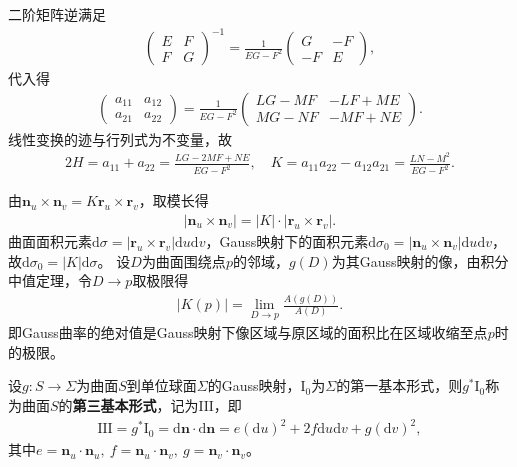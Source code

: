 \documentclass[../../main.tex]{subfiles}%
\begin{document}
二阶矩阵逆满足
\begin{align*}
\begin{pmatrix}
E & F\\
F & G
\end{pmatrix}^{-1}=\frac{1}{EG-F^2}
\begin{pmatrix}
G & -F\\
-F & E
\end{pmatrix},
\end{align*}
代入得
\begin{align}
\begin{pmatrix}
a_{11} & a_{12}\\
a_{21} & a_{22}
\end{pmatrix}=\frac{1}{EG-F^2}
\begin{pmatrix}
LG-MF & -LF+ME\\
MG-NF & -MF+NE
\end{pmatrix}.\label{eq:weingarten_matrix_expand}
\end{align}
线性变换的迹与行列式为不变量，故
\begin{align*}
2H=a_{11}+a_{22}=\frac{LG-2MF+NE}{EG-F^2},\quad K=a_{11}a_{22}-a_{12}a_{21}=\frac{LN-M^2}{EG-F^2}.
\end{align*}

由$\boldsymbol{n}_u\times\boldsymbol{n}_v=K\boldsymbol{r}_u\times\boldsymbol{r}_v$，取模长得
\begin{align}
|\boldsymbol{n}_u\times\boldsymbol{n}_v|=|K|\cdot|\boldsymbol{r}_u\times\boldsymbol{r}_v|.\label{eq:gauss_curvature_cross_prod}
\end{align}
曲面面积元素$\mathrm{d}\sigma=|\boldsymbol{r}_u\times\boldsymbol{r}_v|\mathrm{d}u\mathrm{d}v$，Gauss映射下的面积元素$\mathrm{d}\sigma_0=|\boldsymbol{n}_u\times\boldsymbol{n}_v|\mathrm{d}u\mathrm{d}v$，故$\mathrm{d}\sigma_0=|K|\mathrm{d}\sigma$。
设$D$为曲面围绕点$p$的邻域，$g(D)$为其Gauss映射的像，由积分中值定理，令$D\to p$取极限得
\begin{align}
|K(p)|=\lim\limits_{D\to p}\frac{A(g(D))}{A(D)}.\label{eq:gauss_curvature_geo_meaning}
\end{align}
即Gauss曲率的绝对值是Gauss映射下像区域与原区域的面积比在区域收缩至点$p$时的极限。

\begin{definition}
设$g:S\to\Sigma$为曲面$S$到单位球面$\Sigma$的Gauss映射，$\mathrm{I}_0$为$\Sigma$的第一基本形式，则$g^*\mathrm{I}_0$称为曲面$S$的\textbf{第三基本形式}，记为$\mathrm{III}$，即
\begin{align}
\mathrm{III}=g^*\mathrm{I}_0=\mathrm{d}\boldsymbol{n}\cdot\mathrm{d}\boldsymbol{n}=e(\mathrm{d}u)^2+2f\mathrm{d}u\mathrm{d}v+g(\mathrm{d}v)^2,\label{eq:third_form_def}
\end{align}
其中$e=\boldsymbol{n}_u\cdot\boldsymbol{n}_u,\ f=\boldsymbol{n}_u\cdot\boldsymbol{n}_v,\ g=\boldsymbol{n}_v\cdot\boldsymbol{n}_v$。
\end{definition}
\end{document}
